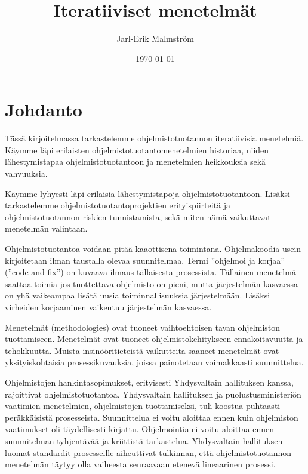 \documentclass[finnish]{tktltiki2}
\title{Iteratiiviset menetelmät}
\author{Jarl-Erik Malmström}
\date{\today}
\theoremstyle{definition}
\theoremstyle{remark}
\begin{document}

\maketitle        %
\makeabstract     %

\tableofcontents  %
\newpage          %



\section{Johdanto}

Tässä kirjoitelmassa tarkastelemme ohjelmistotuotannon iteratiivisia menetelmiä. Käymme läpi erilaisten ohjelmistotuotantomenetelmien historiaa, niiden lähestymistapaa ohjelmistotuotantoon ja menetelmien heikkouksia sekä vahvuuksia. 

Käymme lyhyesti läpi erilaisia lähestymistapoja ohjelmistotuotantoon. Lisäksi tarkastelemme ohjelmistotuotantoprojektien erityispiirteitä ja ohjelmistotuotannon riskien tunnistamista, sekä miten nämä vaikuttavat menetelmän valintaan. 

Ohjelmistotuotantoa voidaan pitää kaaottisena toimintana. Ohjelmakoodia usein kirjoitetaan ilman taustalla olevaa suunnitelmaa. Termi ''ohjelmoi ja korjaa'' (''code and fix'') on kuvaava ilmaus tällaisesta prosessista. Tällainen menetelmä saattaa toimia jos tuottettava ohjelmisto on pieni, mutta järjestelmän kasvaessa on yhä vaikeampaa lisätä uusia toiminnallisuuksia järjestelmään. Lisäksi virheiden korjaaminen vaikeutuu järjestelmän kasvaessa\cite{FOM01}.

Menetelmät (methodologies) ovat tuoneet vaihtoehtoisen tavan  ohjelmiston tuottamiseen. Menetelmät ovat tuoneet ohjelmistokehitykseen ennakoitavuutta ja tehokkuutta. Muista insinööritieteistä vaikutteita saaneet menetelmät ovat yksityiskohtaisia prosessikuvauksia, joissa painotetaan voimakkaasti suunnittelua\cite{FOM01}.

Ohjelmistojen hankintasopimukset, erityisesti Yhdysvaltain hallituksen kanssa, rajoittivat ohjelmistotuotantoa. Yhdysvaltain hallituksen ja puolustusministeriön vaatimien menetelmien, ohjelmistojen tuottamiseksi, tuli koostua puhtaasti peräkkäisistä prosesseista. Suunnittelua ei voitu aloittaa ennen kuin ohjelmiston vaatimukset oli täydellisesti kirjattu. Ohjelmointia ei voitu aloittaa ennen suunnitelman tyhjentävää ja kriittistä tarkastelua. Yhdysvaltain hallituksen luomat standardit prosesseille aiheuttivat tulkinnan, että ohjelmistotuotannon menetelmän täytyy olla vaiheesta seuraavaan etenevä lineaarinen prosessi\cite{BOE06}.
\end{document}
